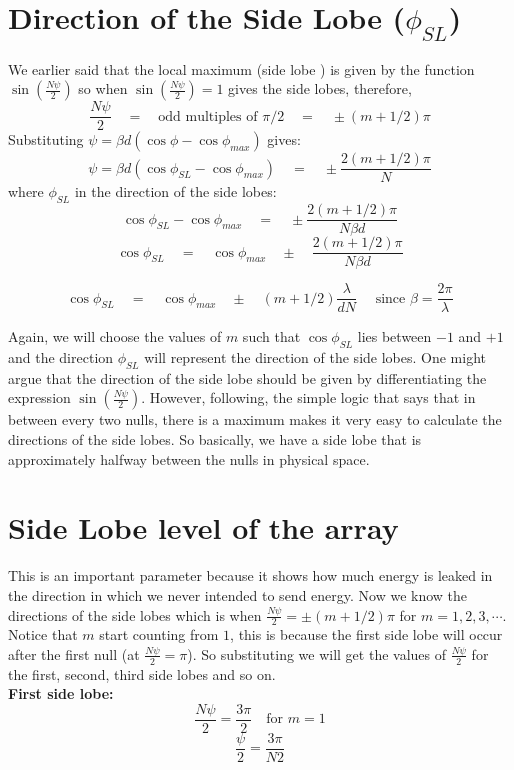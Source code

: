 \section{Direction of the Side Lobe ($\phi_{SL}$)}
We earlier said that the local maximum (side lobe ) is given by the function $\sin{(\frac{N\psi}{2})}$ so when $\sin{(\frac{N\psi}{2})} = 1$ gives the side lobes, therefore, 
$$ \frac{N\psi}{2} \quad = \quad \text{odd multiples of $\pi/2$} \quad = \quad \pm (m + 1/2) \pi $$
Substituting $ \psi = \beta d (\cos\phi - \cos\phi_{max}) $ gives:
$$ \psi = \beta d (\cos\phi_{SL} - \cos\phi_{max}) \quad= \quad \pm \frac{2(m + 1/2) \pi}{N}$$
where $\phi_{SL}$ in the direction of the side lobes:
$$ \cos\phi_{SL} - \cos\phi_{max} \quad= \quad \pm \frac{2(m + 1/2) \pi}{N \beta d} $$
$$ \cos\phi_{SL} \quad= \quad  \cos\phi_{max}  \quad \pm \quad \frac{2(m + 1/2) \pi}{N \beta d} $$

$$ \cos\phi_{SL} \quad= \quad  \cos\phi_{max}  \quad \pm \quad (m + 1/2) \frac{\lambda}{dN} \quad \text{ since $\beta=\frac{2\pi}{\lambda}$} $$

Again, we will choose the values of $m$ such that $\cos\phi_{SL}$ lies between $-1$ and $+1$ and the direction $\phi_{SL}$ will represent the direction of the side lobes. One might argue that the direction of the side lobe should be given by differentiating the expression $\sin{(\frac{N\psi}{2})}$. However, following, the simple logic that says that in between every two nulls, there is a maximum makes it very easy to calculate the directions of the side lobes. So basically, we have a side lobe that is approximately halfway between the nulls in physical space.

\section{Side Lobe level of the array}
This is an important parameter because it shows how much energy is leaked in the direction in which we never intended to send energy. Now we know the directions of the side lobes which is when $\frac{N\psi}{2} = \pm (m + 1/2) \pi $ for $m=1,2,3,\cdots$. Notice that $m$ start counting from $1$, this is because the first side lobe will occur after the first null  (at $\frac{N\psi}{2} = \pi$). So substituting we will get the values of $\frac{N\psi}{2}$ for the first, second, third side lobes and so on.\\
\textbf{First side lobe:}
$$\frac{N\psi}{2} = \frac{3\pi}{2} \quad \text{for $m=1$} $$
$$ \frac{\psi}{2} = \frac{3\pi}{N2} $$

